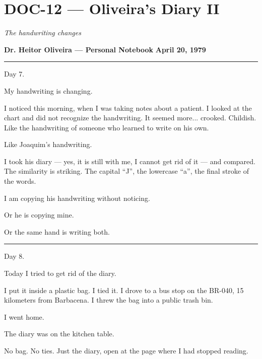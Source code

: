 \section*{\textbf{DOC-12} --- Oliveira's Diary II}

\noindent \textit{The handwriting changes}

\noindent \textbf{Dr. Heitor Oliveira --- Personal Notebook}
\textbf{April 20, 1979}

\vspace{0.5em}\noindent\rule{\textwidth}{0.5pt}\vspace{0.5em}

\noindent Day 7.

\noindent My handwriting is changing.

\noindent I noticed this morning, when I was taking notes about a patient. I looked at the chart and did not recognize the handwriting. It seemed more... crooked. Childish. Like the handwriting of someone who learned to write on his own.

\noindent Like Joaquim's handwriting.

\noindent I took his diary --- yes, it is still with me, I cannot get rid of it --- and compared. The similarity is striking. The capital \textquotedblleft{}J\textquotedblright{}, the lowercase \textquotedblleft{}a\textquotedblright{}, the final stroke of the words.

\noindent I am copying his handwriting without noticing.

\noindent Or he is copying mine.

\noindent Or the same hand is writing both.

\vspace{0.5em}\noindent\rule{\textwidth}{0.5pt}\vspace{0.5em}

\noindent Day 8.

\noindent Today I tried to get rid of the diary.

\noindent I put it inside a plastic bag. I tied it. I drove to a bus stop on the BR-040, 15 kilometers from Barbacena. I threw the bag into a public trash bin.

\noindent I went home.

\noindent The diary was on the kitchen table.

\noindent No bag. No ties. Just the diary, open at the page where I had stopped reading.


